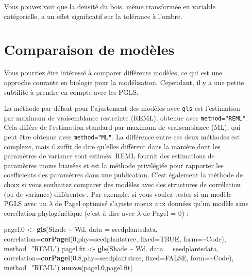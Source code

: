 \documentclass[
]{book}
\newenvironment{Shaded}{\begin{snugshade}}{\end{snugshade}}
\newcommand{\AttributeTok}[1]{\textcolor[rgb]{0.13,0.29,0.53}{#1}}
\newcommand{\ConstantTok}[1]{\textcolor[rgb]{0.56,0.35,0.01}{#1}}
\newcommand{\DecValTok}[1]{\textcolor[rgb]{0.00,0.00,0.81}{#1}}
\newcommand{\FloatTok}[1]{\textcolor[rgb]{0.00,0.00,0.81}{#1}}
\newcommand{\FunctionTok}[1]{\textcolor[rgb]{0.13,0.29,0.53}{\textbf{#1}}}
\newcommand{\NormalTok}[1]{#1}
\newcommand{\OtherTok}[1]{\textcolor[rgb]{0.56,0.35,0.01}{#1}}
\newcommand{\SpecialCharTok}[1]{\textcolor[rgb]{0.81,0.36,0.00}{\textbf{#1}}}
\newcommand{\StringTok}[1]{\textcolor[rgb]{0.31,0.60,0.02}{#1}}
\begin{document}
Vous pouvez voir que la densité du bois, même transformée en variable catégorielle, a un effet significatif sur la tolérance à l'ombre.

\chapter{Comparaison de modèles}\label{comparaison-de-moduxe8les}

Vous pourriez être intéressé à comparer différents modèles, ce qui est une approche courante en biologie pour la modélisation. Cependant, il y a une petite subtilité à prendre en compte avec les PGLS.

La méthode par défaut pour l'ajustement des modèles avec \texttt{gls} est l'estimation par maximum de vraisemblance restreinte (REML), obtenue avec \texttt{method="REML"}. Cela diffère de l'estimation standard par maximum de vraisemblance (ML), qui peut être obtenue avec \texttt{method="ML"}. La différence entre ces deux méthodes est complexe, mais il suffit de dire qu'elles diffèrent dans la manière dont les paramètres de variance sont estimés. REML fournit des estimations de paramètres moins biaisées et est la méthode privilégiée pour rapporter les coefficients des paramètres dans une publication. C'est également la méthode de choix si vous souhaitez comparer des modèles avec des structures de corrélation (ou de variance) différentes \citep{zuur2009mixed}. Par exemple, si vous voulez tester si un modèle PGLS avec un \(\lambda\) de Pagel optimisé s'ajuste mieux aux données qu'un modèle sans corrélation phylogénétique (c'est-à-dire avec \(\lambda\) de Pagel = 0) :

\begin{Shaded}
\begin{Highlighting}[]
\NormalTok{pagel}\FloatTok{.0} \OtherTok{\textless{}{-}} \FunctionTok{gls}\NormalTok{(Shade }\SpecialCharTok{\textasciitilde{}}\NormalTok{ Wd, }\AttributeTok{data =}\NormalTok{ seedplantsdata, }
               \AttributeTok{correlation=}\FunctionTok{corPagel}\NormalTok{(}\DecValTok{0}\NormalTok{,}\AttributeTok{phy=}\NormalTok{seedplantstree, }
                                    \AttributeTok{fixed=}\ConstantTok{TRUE}\NormalTok{, }\AttributeTok{form=}\SpecialCharTok{\textasciitilde{}}\NormalTok{Code), }
               \AttributeTok{method=}\StringTok{"REML"}\NormalTok{)}
\NormalTok{pagel.fit }\OtherTok{\textless{}{-}} \FunctionTok{gls}\NormalTok{(Shade }\SpecialCharTok{\textasciitilde{}}\NormalTok{ Wd, }\AttributeTok{data =}\NormalTok{ seedplantsdata, }
                 \AttributeTok{correlation=}\FunctionTok{corPagel}\NormalTok{(}\FloatTok{0.8}\NormalTok{,}\AttributeTok{phy=}\NormalTok{seedplantstree, }
                                      \AttributeTok{fixed=}\ConstantTok{FALSE}\NormalTok{, }\AttributeTok{form=}\SpecialCharTok{\textasciitilde{}}\NormalTok{Code),}
                 \AttributeTok{method=}\StringTok{"REML"}\NormalTok{)}
\FunctionTok{anova}\NormalTok{(pagel}\FloatTok{.0}\NormalTok{,pagel.fit)}
\end{Highlighting}
\end{Shaded}
\end{document}
